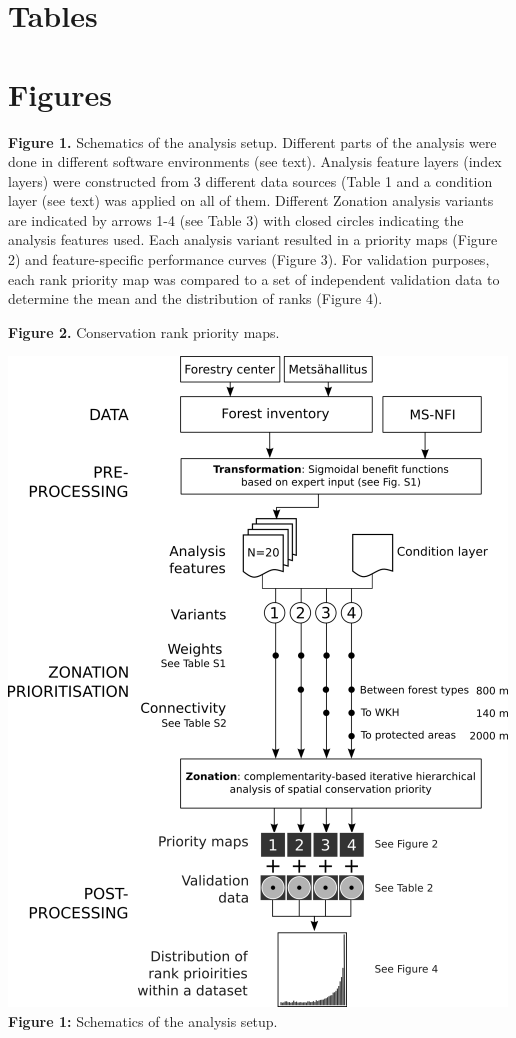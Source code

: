 \documentclass[]{article}
\begin{document}
\section{Tables}

\section{Figures}

\textbf{Figure 1.} Schematics of the analysis setup. Different parts of
the analysis were done in different software environments (see text).
Analysis feature layers (index layers) were constructed from 3 different
data sources (Table 1 and a condition layer (see text) was applied on
all of them. Different Zonation analysis variants are indicated by
arrows 1-4 (see Table 3) with closed circles indicating the analysis
features used. Each analysis variant resulted in a priority maps (Figure
2) and feature-specific performance curves (Figure 3). For validation
purposes, each rank priority map was compared to a set of independent
validation data to determine the mean and the distribution of ranks
(Figure 4).

\textbf{Figure 2.} Conservation rank priority maps.

\includegraphics{figs/Fig1_w500.png}\\\textbf{Figure 1:} Schematics of
the analysis setup.
\end{document}
